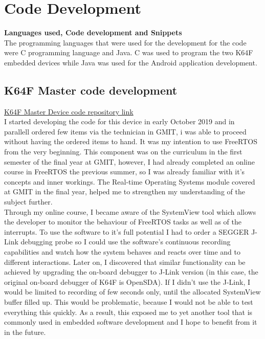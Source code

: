 \documentclass[12pt,a4paper]{article}
\begin{document}
            \newpage
		
		\section{Code Development}
		{\bfseries Languages used, Code development and Snippets}\\
		
		The programming languages that were used for the development for the code were C programming language and Java. C was used to program the two K64F embedded devices while Java was used for the Android application development.
		
		\subsection{K64F Master code development}
		\href{https://github.com/zedd-1983/project_journal/tree/bt2}{K64F Master Device code repository link}\\
		
		I started developing the code for this device in early October 2019 and in parallell ordered few items via the technician in GMIT, i was able to proceed without having the ordered items to hand.  It was my intention to use FreeRTOS from the very beginning. This component was on the curriculum in the first semester of the final year at GMIT, however, I had already completed an online course in FreeRTOS the previous summer, so I was already familiar with it's concepts and inner workings. The Real-time Operating Systems module covered at GMIT in the final year, helped me to strengthen my understanding of the subject further.\\
		
		Through my online course, I became aware of the SystemView tool which allows the developer to monitor the behaviour of FreeRTOS tasks as well as of the interrupts. To use the software to it's full potential I had to order a SEGGER J-Link debugging probe so I could use the software's continuous recording capabilities and watch how the system behaves and reacts over time and to different interactions. Later on, I discovered that similar functionality can be achieved by upgrading the on-board debugger to J-Link version (in this case, the original on-board debugger of K64F is OpenSDA). If I didn't use the J-Link, I would be limited to recording of few seconds only, until the allocated SystemView buffer filled up. This would be problematic, because I would not be able to test everything this quickly. As a result, this exposed me to yet another tool that is commonly used in embedded software development and I hope to benefit from it in the future.\\
		
\end{document}
